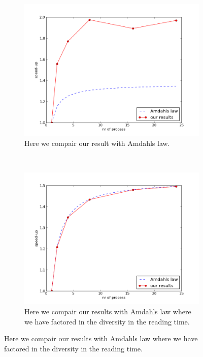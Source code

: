 \documentclass[a4paper,10pt]{article}
\begin{document}
\begin{figure}[h!]
        \centering
        \begin{subfigure}[b]{0.70\textwidth}
                \centering
                \includegraphics[width=\textwidth]{graphics/openmp17gb/Amdahls_law.png}
                \caption{Here we compair our result with Amdahls law.}
                \label{fig:openmp_amad1}
        \end{subfigure}%
        \\
        \begin{subfigure}[b]{0.70\textwidth}
                \centering
                \includegraphics[width=\textwidth]{graphics/openmp17gb/Amdahls_law2.png}
                \caption{Here we compair our results with Amdahls law where we have factored in
                         the diversity in the reading time.}
                \label{fig:openmp_amad2}
        \end{subfigure}
\end{figure}
\end{document}
